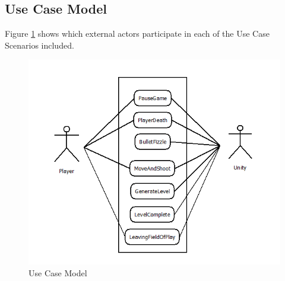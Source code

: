 \documentclass[12pt]{article}       %
\begin{document}
\newpage
\subsection{Use Case Model}
Figure \ref{Use Case Model} shows which external actors participate in each of the Use Case Scenarios included.

\begin{figure} [H]
\centering
\includegraphics[width=5.5in]{UseCaseModel1.png}
\caption{Use Case Model} \label{Use Case Model}
\end{figure}
\end{document}
